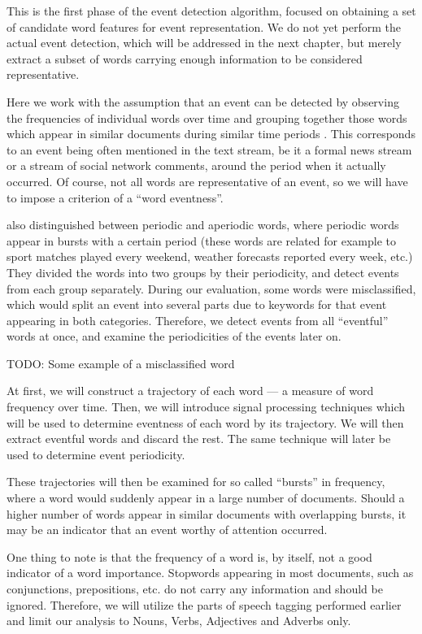 This is the first phase of the event detection algorithm, focused on obtaining a set of candidate word features for event representation. We do not yet perform the actual event detection, which will be addressed in the next chapter, but merely extract a subset of words carrying enough information to be considered representative.

Here we work with the assumption that an event can be detected by observing the frequencies of individual words over time and grouping together those words which appear in similar documents during similar time periods \cite{event-detection, parameter-free}. This corresponds to an event being often mentioned in the text stream, be it a formal news stream or a stream of social network comments, around the period when it actually occurred. Of course, not all words are representative of an event, so we will have to impose a criterion of a ``word eventness''.

\cite{event-detection} also distinguished between periodic and aperiodic words, where periodic words appear in bursts with a certain period (these words are related for example to sport matches played every weekend, weather forecasts reported every week, etc.) They divided the words into two groups by their periodicity, and detect events from each group separately. During our evaluation, some words were misclassified, which would split an event into several parts due to keywords for that event appearing in both categories. Therefore, we detect events from all ``eventful'' words at once, and examine the periodicities of the events later on.

{\color{red} TODO: Some example of a misclassified word}

At first, we will construct a trajectory of each word --- a measure of word frequency over time. Then, we will introduce signal processing techniques which will be used to determine eventness of each word by its trajectory. We will then extract eventful words and discard the rest. The same technique will later be used to determine event periodicity.

These trajectories will then be examined for so called ``bursts'' in frequency, where a word would suddenly appear in a large number of documents. Should a higher number of words appear in similar documents with overlapping bursts, it may be an indicator that an event worthy of attention occurred.

One thing to note is that the frequency of a word is, by itself, not a good indicator of a word importance.
Stopwords appearing in most documents, such as conjunctions, prepositions, etc. do not carry any information and should be ignored. Therefore, we will utilize the parts of speech tagging performed earlier and limit our analysis to Nouns, Verbs, Adjectives and Adverbs only.

